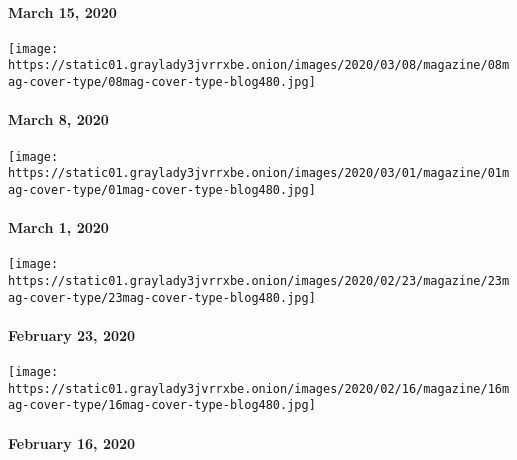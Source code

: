 \hypertarget{march-15-2020}{%
\paragraph{March 15, 2020}\label{march-15-2020}}

\href{https://www.nytimes3xbfgragh.onion/issue/magazine/2020/03/05/the-3820-issue}{}

\texttt{[image: https://static01.graylady3jvrrxbe.onion/images/2020/03/08/magazine/08mag-cover-type/08mag-cover-type-blog480.jpg]}

\hypertarget{march-8-2020}{%
\paragraph{March 8, 2020}\label{march-8-2020}}

\href{https://www.nytimes3xbfgragh.onion/issue/magazine/2020/02/27/the-3120-issue}{}

\texttt{[image: https://static01.graylady3jvrrxbe.onion/images/2020/03/01/magazine/01mag-cover-type/01mag-cover-type-blog480.jpg]}

\hypertarget{march-1-2020}{%
\paragraph{March 1, 2020}\label{march-1-2020}}

\href{https://www.nytimes3xbfgragh.onion/issue/magazine/2020/02/20/the-22320-issue}{}

\texttt{[image: https://static01.graylady3jvrrxbe.onion/images/2020/02/23/magazine/23mag-cover-type/23mag-cover-type-blog480.jpg]}

\hypertarget{february-23-2020}{%
\paragraph{February 23, 2020}\label{february-23-2020}}

\href{https://www.nytimes3xbfgragh.onion/issue/magazine/2020/02/13/the-21620-issue}{}

\texttt{[image: https://static01.graylady3jvrrxbe.onion/images/2020/02/16/magazine/16mag-cover-type/16mag-cover-type-blog480.jpg]}

\hypertarget{february-16-2020}{%
\paragraph{February 16, 2020}\label{february-16-2020}}

